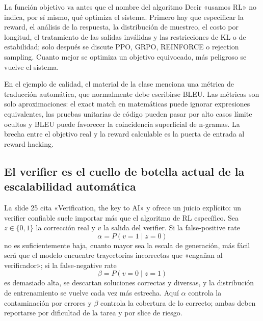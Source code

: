 

\begin{importantbox}{La función objetivo va antes que el nombre del algoritmo}
Decir «usamos RL» no indica, por sí mismo, qué optimiza el sistema. Primero hay que especificar la reward, el análisis de la respuesta, la distribución de muestreo, el costo por longitud, el tratamiento de las salidas inválidas y las restricciones de KL o de estabilidad; solo después se discute PPO, GRPO, REINFORCE o rejection sampling. Cuanto mejor se optimiza un objetivo equivocado, más peligroso se vuelve el sistema.
\end{importantbox}

En el ejemplo de calidad, el material de la clase menciona una métrica de traducción automática, que normalmente debe escribirse BLEU. Las métricas son solo aproximaciones: el exact match en matemáticas puede ignorar expresiones equivalentes, las pruebas unitarias de código pueden pasar por alto casos límite ocultos y BLEU puede favorecer la coincidencia superficial de n-gramas. La brecha entre el objetivo real y la reward calculable es la puerta de entrada al reward hacking.

\subsection{El verifier es el cuello de botella actual de la escalabilidad automática}

La slide 25 cita «Verification, the key to AI» y ofrece un juicio explícito: un verifier confiable suele importar más que el algoritmo de RL específico. Sea $z\in\{0,1\}$ la corrección real y $v$ la salida del verifier. Si la false-positive rate
\[
\alpha=P(v=1\mid z=0)
\]
no es suficientemente baja, cuanto mayor sea la escala de generación, más fácil será que el modelo encuentre trayectorias incorrectas que «engañan al verificador»; si la false-negative rate
\[
\beta=P(v=0\mid z=1)
\]
es demasiado alta, se descartan soluciones correctas y diversas, y la distribución de entrenamiento se vuelve cada vez más estrecha. Aquí $\alpha$ controla la contaminación por errores y $\beta$ controla la cobertura de lo correcto; ambas deben reportarse por dificultad de la tarea y por slice de riesgo.

